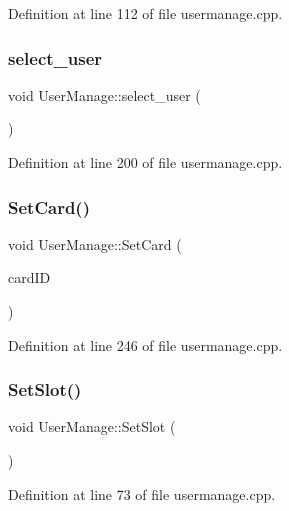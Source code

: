 Definition at line 112 of file usermanage.\+cpp.

\mbox{\label{class_user_manage_aa6252c8286f24959ec4b938054328bf7}} 
\subsubsection{\texorpdfstring{select\_user}{select\_user}}
{\footnotesize\ttfamily void User\+Manage\+::select\+\_\+user (\begin{DoxyParamCaption}{ }\end{DoxyParamCaption})\hspace{0.3cm}{\ttfamily [slot]}}



Definition at line 200 of file usermanage.\+cpp.

\mbox{\label{class_user_manage_ab4b39d4a967fc173c0a5ae5d3e2f2ef8}} 
\subsubsection{\texorpdfstring{SetCard()}{SetCard()}}
{\footnotesize\ttfamily void User\+Manage\+::\+Set\+Card (\begin{DoxyParamCaption}\item[{Q\+String}]{card\+ID }\end{DoxyParamCaption})}



Definition at line 246 of file usermanage.\+cpp.

\mbox{\label{class_user_manage_aa838d49f063bc0a081a1eb4d967c2da3}} 
\subsubsection{\texorpdfstring{SetSlot()}{SetSlot()}}
{\footnotesize\ttfamily void User\+Manage\+::\+Set\+Slot (\begin{DoxyParamCaption}{ }\end{DoxyParamCaption})}



Definition at line 73 of file usermanage.\+cpp.

